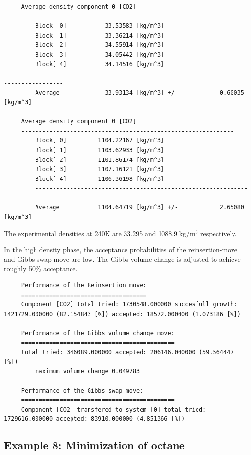\begin{tiny}
\begin{verbatim}
     Average density component 0 [CO2]
     -------------------------------------------------------------
         Block[ 0]           33.53583 [kg/m^3]
         Block[ 1]           33.36214 [kg/m^3]
         Block[ 2]           34.55914 [kg/m^3]
         Block[ 3]           34.05442 [kg/m^3]
         Block[ 4]           34.14516 [kg/m^3]
         ------------------------------------------------------------------------------
         Average             33.93134 [kg/m^3] +/-            0.60035 [kg/m^3]
     
     Average density component 0 [CO2]
     -------------------------------------------------------------
         Block[ 0]         1104.22167 [kg/m^3]
         Block[ 1]         1103.62933 [kg/m^3]
         Block[ 2]         1101.86174 [kg/m^3]
         Block[ 3]         1107.16121 [kg/m^3]
         Block[ 4]         1106.36198 [kg/m^3]
         ------------------------------------------------------------------------------
         Average           1104.64719 [kg/m^3] +/-            2.65080 [kg/m^3]
\end{verbatim}
\end{tiny}
The experimental densities at 240K are 33.295 and 1088.9 kg/m$^3$ respectively.

\noindent
In the high density phase, the acceptance probabilities of the reinsertion-move and Gibbs swap-move are low.
The Gibbs volume change is adjusted to achieve roughly 50\% acceptance.
\begin{tiny}
\begin{verbatim}
     Performance of the Reinsertion move:
     ====================================
     Component [CO2] total tried: 1730548.000000 succesfull growth: 1421729.000000 (82.154843 [%]) accepted: 18572.000000 (1.073186 [%])
     
     Performance of the Gibbs volume change move:
     ============================================
     total tried: 346089.000000 accepted: 206146.000000 (59.564447 [%])
         maximum volume change 0.049783
     
     Performance of the Gibbs swap move:
     ============================================
     Component [CO2] transfered to system [0] total tried: 1729616.000000 accepted: 83910.000000 (4.851366 [%])
\end{verbatim}
\end{tiny}


\subsection*{Example 8: Minimization of octane}

